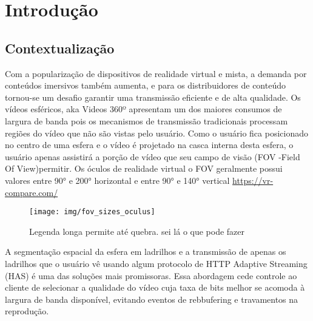 
\chapter{Introdução}\label{Cap:Introduction}

	
\section{Contextualização}

Com a popularização de dispositivos de realidade virtual e mista, a demanda por conteúdos imersivos também aumenta, e para os distribuidores de conteúdo tornou-se um desafio garantir uma transmissão eficiente e de alta qualidade. Os vídeos esféricos, aka Videos 360º apresentam um dos maiores consumos de largura de banda pois os mecanismos de transmissão tradicionais processam regiões do vídeo que não são vistas pelo usuário. Como o usuário fica posicionado no centro de uma esfera e o vídeo é projetado na casca interna desta esfera, o usuário apenas assistirá a porção de vídeo que seu campo de visão (FOV -Field Of View)permitir. Os óculos de realidade virtual o FOV geralmente possui valores entre 90° e 200° horizontal e entre 90° e 140° vertical 
\href{https://vr-compare.com/}{https://vr-compare.com/}

\begin{figure}[tbh]
	\centering
	\texttt{[image: img/fov\_sizes\_oculus]}
	\caption[legenda curta]{Legenda longa permite até quebra. sei lá o que pode fazer}
	\label{fig:fovsizesoculus}
\end{figure}

A segmentação espacial da esfera em ladrilhos e a transmissão de apenas os ladrilhos que o usuário vê usando algum protocolo de HTTP Adaptive Streaming (HAS) é uma das soluções mais promissoras. Essa abordagem cede controle ao cliente de selecionar a qualidade do vídeo cuja taxa de bits melhor se acomoda à largura de banda disponível, evitando eventos de rebbufering e travamentos na reprodução.

